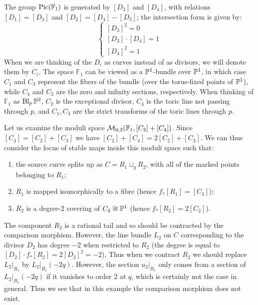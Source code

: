 The group $\operatorname{Pic}(\mathbb F_1)$ is generated by $[D_3]$ and $[D_4]$, with relations $[D_1]=[D_3]$ and $[D_2]=[D_4]-[D_3]$; the intersection form is given by:
\[
{}
\begin{cases}
 [D_3]^2=0 \\
 [D_3]\cdot [D_4]=1 \\
 [D_4]^2=1
\end{cases} 
\]
When we are thinking of the $D_i$ as curves instead of as divisors, we will denote them by $C_i$. The space $\mathbb F_1$ can be viewed as a $\mathbb P^1$-bundle over $\mathbb P^1$, in which case $C_1$ and $C_3$ represent the fibers of the bundle (over the torus-fixed points of $\mathbb P^1$), while $C_4$ and $C_2$ are the zero and infinity sections, respectively. When thinking of $\mathbb F_1$ as $\operatorname{Bl}_{p}\mathbb P^2$, $C_2$ is the exceptional divisor, $C_4$ is the toric line not passing through $p$, and $C_1,C_3$ are the strict transforms of the toric lines through $p$.

Let us examine the moduli space $\mathcal{M}_{0,2}(\mathbb F_1,[C_2]+[C_4])$. Since $[C_4] = [C_2]+[C_3]$ we have $[C_2]+[C_4] = 2[C_2] + [C_3]$. We can thus consider the locus of stable maps inside this moduli space such that:
\begin{enumerate}
\item the source curve splits up as $C=R_1 \sqcup_q R_2$, with all of the marked points belonging to $R_1$;
\item $R_1$ is mapped isomorphically to a fibre (hence $f_*[R_1] = [C_3]$);
\item $R_2$ is a degree-$2$ covering of $C_2 \cong \mathbb P^1$ (hence $f_*[R_2]=2[C_2]$).
\end{enumerate}
The component $R_2$ is a rational tail and so should be contracted by the comparison morphism. However, the line bundle $L_2$ on $C$ corresponding to the divisor $D_2$ has degree $-2$ when restricted to $R_2$ (the degree is equal to $[D_2] \cdot f_*[R_2]=2[D_2]^2 = -2$). Thus when we contract $R_2$ we should replace $L_2|_{R_1}$ by $L_2|_{R_1}(-2q)$. However, the section $u_2|_{R_1}$ only comes from a section of $L_2|_{R_1}(-2q)$ if it vanishes to order $2$ at $q$, which is certainly not the case in general. Thus we see that in this example the comparison morphism does not exist.

\begin{comment}

\textcolor{blue}{Something is going on here: in this case there is a boundary component where the map is of the type that we have just described, and the requirement that $u_{2|R_1}$ vanishes of order $2$ at the node defines precisely the intersection with the main component. Check this. Could we possibly exploit this phenomenon to define a smaller compactification, possibly even smaller than quasimaps?} 

\end{comment}